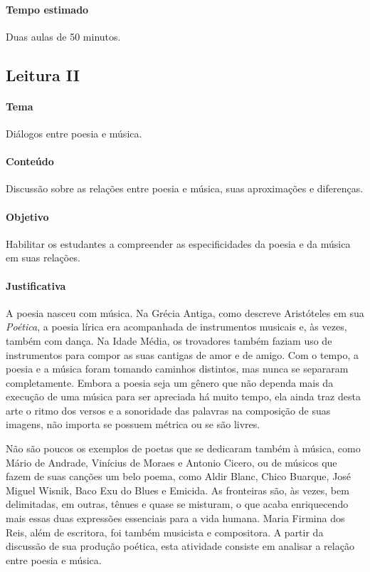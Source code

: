\documentclass[12pt]{extarticle}
\begin{document}
\paragraph{Tempo estimado} Duas aulas de 50 minutos.

\subsection{Leitura II}

\paragraph{Tema} Diálogos entre poesia e música.

\paragraph{Conteúdo} Discussão sobre as relações entre poesia e música,
suas aproximações e diferenças.

\paragraph{Objetivo} Habilitar os estudantes a compreender as
especificidades da poesia e da música em suas relações.


\paragraph{Justificativa} A poesia nasceu com música. Na Grécia Antiga,
como descreve Aristóteles em sua \emph{Poética}, a poesia lírica era
acompanhada de instrumentos musicais e, às vezes, também com dança. Na
Idade Média, os trovadores também faziam uso de instrumentos para compor
as suas cantigas de amor e de amigo. Com o tempo, a poesia e a música
foram tomando caminhos distintos, mas nunca se separaram completamente.
Embora a poesia seja um gênero que não dependa mais da execução de uma
música para ser apreciada há muito tempo, ela ainda traz desta arte o
ritmo dos versos e a sonoridade das palavras na composição de suas
imagens, não importa se possuem métrica ou se são livres.

Não são poucos os exemplos de poetas que se dedicaram também à música,
como Mário de Andrade, Vinícius de Moraes e Antonio Cicero, ou de
músicos que fazem de suas canções um belo poema, como Aldir Blanc, Chico
Buarque, José Miguel Wisnik, Baco Exu do Blues e Emicida. As fronteiras
são, às vezes, bem delimitadas, em outras, tênues e quase se misturam, o
que acaba enriquecendo mais essas duas expressões essenciais para a vida
humana. Maria Firmina dos Reis, além de escritora, foi também musicista
e compositora. A partir da discussão de sua produção poética, esta
atividade consiste em analisar a relação entre poesia e música.
\end{document}
